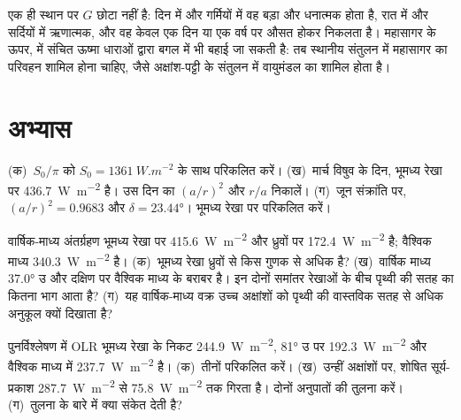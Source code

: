 \begin{remark}[स्थानीय और वैश्विक]\label{rem:b1:radiation-heat-transport:local}
एक ही स्थान पर $G$ छोटा नहीं है: दिन में और गर्मियों में वह बड़ा और धनात्मक होता है, रात में और सर्दियों में ऋणात्मक, और वह केवल एक दिन या एक वर्ष पर औसत होकर निकलता है। महासागर के ऊपर,  में संचित ऊष्मा धाराओं द्वारा बगल में भी बहाई जा सकती है: तब स्थानीय संतुलन में महासागर का परिवहन शामिल होना चाहिए, जैसे अक्षांश-पट्टी के संतुलन में वायुमंडल का शामिल होता है।
\end{remark}

\section{अभ्यास}

\begin{exercise}[$\star$]\label{exo:b1:radiation-heat-transport:1}
(क)~$S_0/\pi$ को $S_0 = \qty{1361}{W.m^{-2}}$ के साथ परिकलित करें। (ख)~मार्च विषुव के दिन, भूमध्य रेखा पर  \qty{436.7}{W.m^{-2}} है। उस दिन का $(a/r)^2$ और $r/a$ निकालें। (ग)~जून संक्रांति पर, $(a/r)^2 = 0.9683$ और $\delta = \ang{23.44}$। भूमध्य रेखा पर  परिकलित करें।
\end{exercise}

\begin{exercise}[$\star$]\label{exo:b1:radiation-heat-transport:2}
वार्षिक-माध्य अंतर्ग्रहण भूमध्य रेखा पर \qty{415.6}{W.m^{-2}} और ध्रुवों पर \qty{172.4}{W.m^{-2}} है; वैश्विक माध्य \qty{340.3}{W.m^{-2}} है। (क)~भूमध्य रेखा ध्रुवों से किस गुणक से अधिक है? (ख)~वार्षिक माध्य \ang{37.0} उ और दक्षिण पर वैश्विक माध्य के बराबर है। इन दोनों समांतर रेखाओं के बीच पृथ्वी की सतह का कितना भाग आता है? (ग)~यह वार्षिक-माध्य वक्र उच्च अक्षांशों को पृथ्वी की वास्तविक सतह से अधिक अनुकूल क्यों दिखाता है?
\end{exercise}

\begin{exercise}[$\star$]\label{exo:b1:radiation-heat-transport:3}
पुनर्विश्लेषण में OLR भूमध्य रेखा के निकट \qty{244.9}{W.m^{-2}}, \ang{81} उ पर \qty{192.3}{W.m^{-2}} और वैश्विक माध्य में \qty{237.7}{W.m^{-2}} है। (क)~तीनों  परिकलित करें। (ख)~उन्हीं अक्षांशों पर, शोषित सूर्य-प्रकाश \qty{287.7}{W.m^{-2}} से \qty{75.8}{W.m^{-2}} तक गिरता है। दोनों अनुपातों की तुलना करें। (ग)~तुलना  के बारे में क्या संकेत देती है?
\end{exercise}

